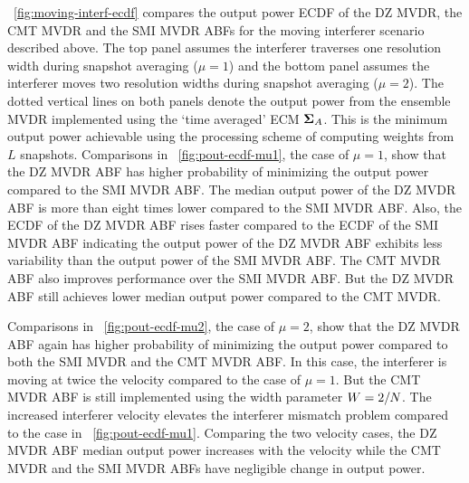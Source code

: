 \figurename{}~\ref{fig:moving-interf-ecdf} compares the output power
ECDF of the DZ MVDR, the CMT MVDR and the SMI MVDR ABFs for the moving
interferer scenario described above. The top panel assumes the
interferer traverses one resolution width during snapshot averaging
($\mu = 1$) and the bottom panel assumes the interferer moves two
resolution widths during snapshot averaging ($\mu = 2$). The dotted
vertical lines on both panels denote the output power from the
ensemble MVDR implemented using the `time averaged' ECM $\boldsymbol{\Sigma}_A$. This is the minimum output power achievable using the processing scheme of computing weights from $L$ snapshots. Comparisons
in \figurename{}~\ref{fig:pout-ecdf-mu1}, the case of $\mu = 1$, show
that the DZ MVDR ABF has higher probability of minimizing the output
power compared to the SMI MVDR ABF. The median output power of the DZ
MVDR ABF is more than eight times lower compared to the SMI MVDR ABF.
Also, the ECDF of the DZ MVDR ABF rises faster compared to the ECDF of
the SMI MVDR ABF indicating the output power of the DZ MVDR ABF
exhibits less variability than the output power of the SMI MVDR
ABF. The CMT MVDR ABF also improves performance over the SMI MVDR
ABF. But the DZ MVDR ABF still achieves lower median output power
compared to the CMT MVDR.

Comparisons in \figurename{}~\ref{fig:pout-ecdf-mu2}, the case of
$\mu = 2$, show that the DZ MVDR ABF again has higher probability of
minimizing the output power compared to both the SMI MVDR and the CMT
MVDR ABF. In this case, the interferer is moving at twice the velocity
compared to the case of $\mu = 1$. But the CMT MVDR ABF is still
implemented using the width parameter $W = 2/N$. The increased
interferer velocity elevates the interferer mismatch problem compared
to the case in \figurename{}~\ref{fig:pout-ecdf-mu1}. Comparing the
two velocity cases, the DZ MVDR ABF median output power increases with
the velocity while the CMT MVDR and the SMI MVDR ABFs have negligible
change in output power.

